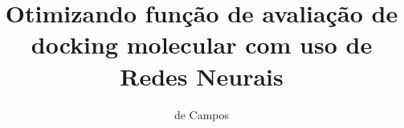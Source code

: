 \documentclass[tcc, capa]{texucpel}
\title{Otimizando função de avaliação de docking molecular com uso de Redes Neurais}
\author{de Campos}{Gianluca}
\begin{document}

\renewcommand{\advisorname}
{Orientador}           %
\renewcommand{\coadvisorname}{Coorientador}      %
\maketitle 

\sloppy











\end{document}
